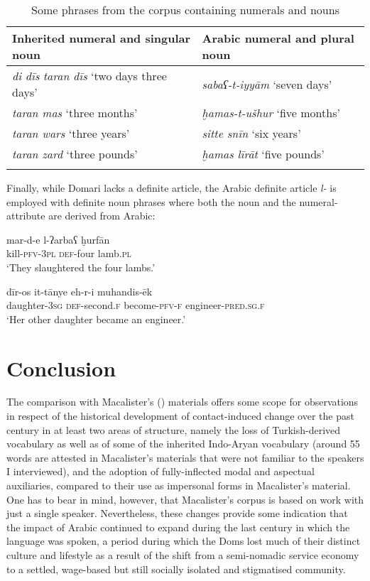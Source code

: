 \documentclass[output=paper]{langsci/langscibook}
\begin{document}
\begin{table}[]
\begin{tabularx}{\textwidth}{XX}
\lsptoprule

\bfseries Inherited numeral and singular noun & \bfseries Arabic numeral and plural noun\\
\midrule
\textit{di dīs} \textit{taran dīs} ‘two days three days’ & \textit{sabaʕ-t-iyyām} ‘seven days’\\
\textit{taran mas} ‘three months’ & \textit{ḫamas-t-ušhur} ‘five months’\\
\textit{taran wars} ‘three years’ & \textit{sitte snīn} ‘six years’\\
\textit{taran zard} ‘three pounds’ & \textit{ḫamas līrāt} ‘five pounds’\\
 \lspbottomrule
\end{tabularx}
  \caption{Some phrases from the corpus containing numerals   and nouns}
  \label{inh}
  \end{table}

Finally, while Domari lacks a definite article, the Arabic definite article \textit{l-} is employed with definite noun phrases where both the noun and the numeral-attribute are derived from Arabic:

\ea
\gll mar-d-e l-ʔarbaʕ ḫurfān\\
         kill-\textsc{pfv-3pl} \textsc{def}-four lamb\textsc{.pl}\\
\glt     ‘They slaughtered the four lambs.’
\z

\ea\gll dīr-os it-tānye eh-r-i muhandis-ēk\\
         daughter-\textsc{3sg} \textsc{def}-second.\textsc{f} become-\textsc{pfv-f}        engineer-\textsc{pred.sg.f}\\
\glt     ‘Her other daughter became an engineer.’
\z

\section{Conclusion
}

The comparison with Macalister's (\citeyear{Macalister1914}) materials offers some scope for observations in respect of the historical development of contact-induced change over the past century in at least two areas of structure, namely the loss of Turkish-derived vocabulary as well as of some of the inherited Indo-Aryan vocabulary (around 55 words are attested in Macalister’s materials that were not familiar to the speakers I interviewed), and the adoption of fully-inflected modal and aspectual auxiliaries, compared to their use as impersonal forms in Macalister’s material. One has to bear in mind, however, that Macalister’s corpus is based on work with just a single speaker. Nevertheless, these changes provide some indication that the impact of Arabic continued to expand during the last century in which the language was spoken, a period during which the Doms lost much of their distinct culture and lifestyle as a result of the shift from a semi-nomadic service economy to a settled, wage-based but still socially isolated and stigmatised community. 
\end{document}
